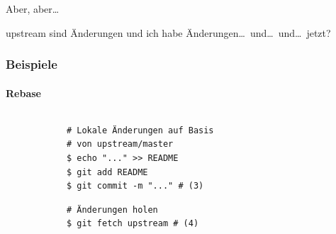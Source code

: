\documentclass[]{beamer}
\begin{document}
\begin{frame}
	\fontsize{30}{10}\selectfont Aber, aber\ldots
	\vspace*{0.5cm}

	\fontsize{20}{10}\selectfont upstream sind Änderungen und ich habe
	Änderungen\ldots\ und\ldots\ und\ldots\ jetzt?
\end{frame}

\begin{frame}[fragile]
	\frametitle{Beispiele}
	\framesubtitle{Rebase}
	\begin{columns}[T]
		\begin{column}{7.5cm}
			\begin{verbatim}
			# Lokale Änderungen auf Basis
			# von upstream/master
			$ echo "..." >> README
			$ git add README
			$ git commit -m "..." # (3)
			\end{verbatim}

			\begin{verbatim}
			# Änderungen holen
			$ git fetch upstream # (4)
			\end{verbatim}
		\end{column}
		\begin{column}{2.5cm}
		\end{column}
	\end{columns}
\end{frame}
\end{document}
